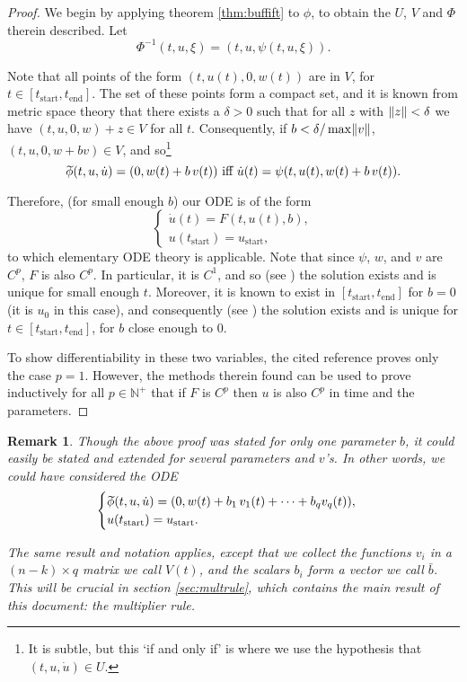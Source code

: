\documentclass{article}
\theoremstyle{plain}
\theoremstyle{plain}
\newtheorem{remark}{Remark}
\theoremstyle{nonumberplain}
\newtheorem{proof}{Proof}
\theoremstyle{empty}
\newcommand{\N}{\mathbb{N}}
\newcommand{\tstart}{\mathrm{start}}
\newcommand{\tend}{\mathrm{end}}
\newcommand{\wtphi}{
  \mspace{2mu}
  \widetilde{\mspace{-2mu}\smash[t]{\phi}}
}
\DeclarePairedDelimiter\norm{\lVert}{\rVert}
\newcommand{\vecb}{{\bar{b}}}
\begin{document}
\begin{proof}
We begin by applying theorem \ref{thm:buffift} to $\phi$, to obtain the $U$, $V$ and $\Phi$ therein described. Let
\[\Phi^{-1}(t,u,\xi) = (t,u,\psi(t,u,\xi)).\]

Note that all points of the form $(t,u(t),0,w(t))$ are in $V$, for $t \in [t_\tstart, t_\tend]$. The set of these points form a compact set, and it is known from metric space theory that there exists a $\delta > 0$ such that for all $z$ with $\norm z < \delta$ we have $(t,u,0,w) + z \in V$ for all $t$. Consequently, if $b < \delta / \max \norm v$, $(t,u,0,w+bv) \in V$, and so\footnote{It is subtle, but this `if and only if' is where we use the hypothesis that $(t,u,\dot u) \in U$.}
\[\wtphi(t, u, \dot u) = (0, w(t) + b\,v(t)) \text{ iff } \dot u(t) = \psi(t,u(t),w(t) + b\,v(t)).\]

Therefore, (for small enough $b$) our ODE is of the form
\[
\begin{cases}
\dot u(t) = F(t,u(t),b),\\
u(t_\tstart) = u_\tstart,
\end{cases}
\]
to which elementary ODE theory is applicable. Note that since $\psi$, $w$, and $v$ are $C^p$, $F$ is also $C^p$. In particular, it is $C^1$, and so (see \cite[p.74]{perko}) the solution exists and is unique for small enough $t$. Moreover, it is known to exist in $[t_\tstart, t_\tend]$ for $b = 0$ (it is $u_0$ in this case), and consequently (see \cite[thm.2,~p.84]{perko}) the solution exists and is unique for $t \in [t_\tstart,t_\tend]$, for $b$ close enough to 0.

To show differentiability in these two variables, the cited reference proves only the case $p = 1$. However, the methods therein found can be used to prove inductively for all $p \in \N^+$ that if $F$ is $C^p$ then $u$ is also $C^p$ in time and the parameters.
\end{proof}

\begin{remark}\label{rmk:perturbation}
Though the above proof was stated for only one parameter $b$, it could easily be stated and extended for several parameters and $v$'s. In other words, we could have considered the ODE
\[
\begin{cases}
\wtphi(t, u, \dot u) = (0, w(t) + b_1\,v_1(t) + \dots + b_q v_q(t)),\\
u(t_\tstart) = u_\tstart.
\end{cases}
\]

The same result and notation applies, except that we collect the functions $v_i$ in a $(n-k) \times q$ matrix we call $V(t)$, and the scalars $b_i$ form a vector we call $\vecb$. This will be crucial in section \ref{sec:multrule}, which contains the main result of this document: the multiplier rule.
\end{remark}
\end{document}
